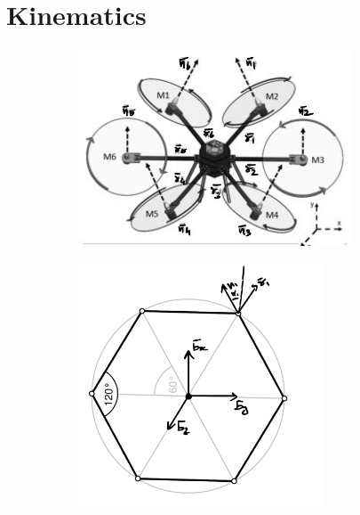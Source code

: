 \section{Kinematics}

\begin{figure}[h]
    \begin{minipage}{0.49\textwidth}
        \begin{figure}[H]
            \centering
            \includegraphics[width = 0.9\textwidth]{./figs/hex_copt-1.jpg}
        \end{figure}
    \end{minipage}
        \begin{minipage}{0.49\textwidth}
        \begin{figure}[H]
            \centering
            \includegraphics[width = 0.8\textwidth]{./figs/hex_copt-2.png}
        \end{figure}
    \end{minipage}
\end{figure}

